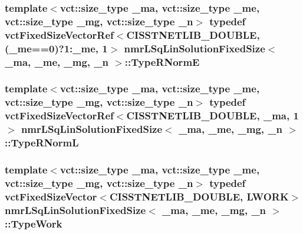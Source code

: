 \hypertarget{classnmr_l_sq_lin_solution_fixed_size_a8d12c1d86e766d8b7782e39f38b90073}{
\subsubsection[{Type\-R\-Norm\-E}]{\setlength{\rightskip}{0pt plus 5cm}template$<$vct\-::size\-\_\-type \-\_\-ma, vct\-::size\-\_\-type \-\_\-me, vct\-::size\-\_\-type \-\_\-mg, vct\-::size\-\_\-type \-\_\-n$>$ typedef {\bf vct\-Fixed\-Size\-Vector\-Ref}$<$C\-I\-S\-S\-T\-N\-E\-T\-L\-I\-B\-\_\-\-D\-O\-U\-B\-L\-E, (\-\_\-me==0)?1\-:\-\_\-me, 1$>$ {\bf nmr\-L\-Sq\-Lin\-Solution\-Fixed\-Size}$<$ \-\_\-ma, \-\_\-me, \-\_\-mg, \-\_\-n $>$\-::{\bf Type\-R\-Norm\-E}}}\label{classnmr_l_sq_lin_solution_fixed_size_a8d12c1d86e766d8b7782e39f38b90073}
\hypertarget{classnmr_l_sq_lin_solution_fixed_size_a61e14c469c463bc06a411061aad13b3a}{
\subsubsection[{Type\-R\-Norm\-L}]{\setlength{\rightskip}{0pt plus 5cm}template$<$vct\-::size\-\_\-type \-\_\-ma, vct\-::size\-\_\-type \-\_\-me, vct\-::size\-\_\-type \-\_\-mg, vct\-::size\-\_\-type \-\_\-n$>$ typedef {\bf vct\-Fixed\-Size\-Vector\-Ref}$<$C\-I\-S\-S\-T\-N\-E\-T\-L\-I\-B\-\_\-\-D\-O\-U\-B\-L\-E, \-\_\-ma, 1$>$ {\bf nmr\-L\-Sq\-Lin\-Solution\-Fixed\-Size}$<$ \-\_\-ma, \-\_\-me, \-\_\-mg, \-\_\-n $>$\-::{\bf Type\-R\-Norm\-L}}}\label{classnmr_l_sq_lin_solution_fixed_size_a61e14c469c463bc06a411061aad13b3a}
\hypertarget{classnmr_l_sq_lin_solution_fixed_size_a2804f3b3815a82a0f9655bcd2f86e7e4}{
\subsubsection[{Type\-Work}]{\setlength{\rightskip}{0pt plus 5cm}template$<$vct\-::size\-\_\-type \-\_\-ma, vct\-::size\-\_\-type \-\_\-me, vct\-::size\-\_\-type \-\_\-mg, vct\-::size\-\_\-type \-\_\-n$>$ typedef {\bf vct\-Fixed\-Size\-Vector}$<$C\-I\-S\-S\-T\-N\-E\-T\-L\-I\-B\-\_\-\-D\-O\-U\-B\-L\-E, {\bf L\-W\-O\-R\-K}$>$ {\bf nmr\-L\-Sq\-Lin\-Solution\-Fixed\-Size}$<$ \-\_\-ma, \-\_\-me, \-\_\-mg, \-\_\-n $>$\-::{\bf Type\-Work}}}\label{classnmr_l_sq_lin_solution_fixed_size_a2804f3b3815a82a0f9655bcd2f86e7e4}
